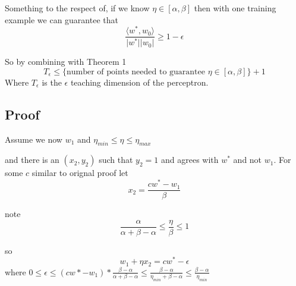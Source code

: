 \documentclass{article}
\begin{document}
Something to the respect of, if we know $\eta \in [\alpha, \beta]$ then with one training example we can guarantee that
$$
\frac{\langle w^*, w_0 \rangle}{\lvert w^* \rvert \lvert w_0 \rvert} \geq 1 - \epsilon
$$

So by combining with Theorem 1
$$
T_\epsilon \leq \{\text{number of points needed to guarantee } \eta \in [\alpha, \beta]\} +1 
$$
Where $T_\epsilon$ is the $\epsilon$ teaching dimension of the perceptron.
\color{black}

\subsection*{Proof}

\color{red}
Assume we now $w_1$
and $\eta_{min} \leq \eta \leq \eta_{max}$

and there is an $(x_2,y_2)$ such that $y_2 = 1$ and agrees with $w^*$ and not $w_1$. For some $c$ similar to orignal proof
let 
$$
x_2 = \frac{cw^* - w_1}{\beta}
$$ 

note 
$$
\frac{\alpha}{\alpha + \beta - \alpha}\leq \frac{\eta}{\beta}  \leq 1
$$

so
$$
w_1 + \eta x_2 = cw^* - \epsilon
$$
where
$
0 \leq \epsilon \leq (cw* - w_1) * \frac{\beta - \alpha}{\alpha + \beta - \alpha}  \leq \frac{\beta - \alpha}{\eta_{min} + \beta - \alpha} \leq \frac{\beta - \alpha}{\eta_{min}}
$

\color{red}
\end{document}
